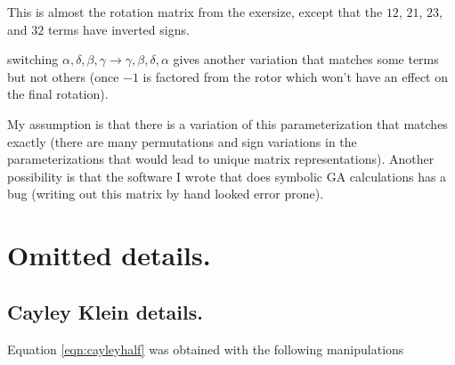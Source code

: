 \documentclass{article}
\begin{document}
This is almost the rotation matrix from the exersize, except that the $12$, $21$, $23$, and $32$ terms have inverted signs.

switching $\alpha,\delta,\beta,\gamma \rightarrow
\gamma,\beta,\delta,\alpha$ gives another variation that matches
some terms but not others (once $-1$ is factored from the rotor which won't
have an effect on the final rotation).

My assumption is that there is a 
variation of this parameterization that matches exactly (there are many permutations and sign variations in the parameterizations that would lead to unique matrix representations).
Another possibility is that the software I wrote that does symbolic
GA calculations has a bug (writing out this matrix by hand looked error prone).

\section{ Omitted details. }
\subsection{ Cayley Klein details. }

Equation \ref{eqn:cayleyhalf} was obtained with the following manipulations
\end{document}

